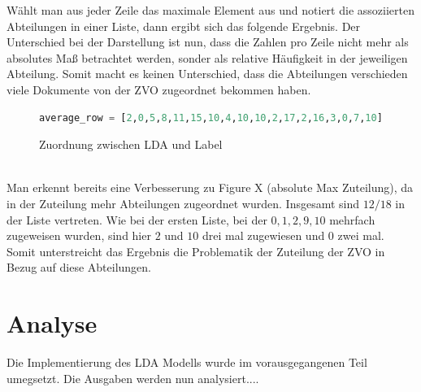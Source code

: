 \documentclass[german,version-2020-11]{uzl-thesis}
\begin{document}
\begin{enumerate}
Wählt man aus jeder Zeile das maximale Element aus und notiert die assoziierten Abteilungen in einer Liste, dann ergibt sich das folgende Ergebnis. Der Unterschied bei der Darstellung ist nun, dass die Zahlen pro Zeile nicht mehr als absolutes Maß betrachtet werden, sonder als relative Häufigkeit in der jeweiligen Abteilung. Somit macht es keinen Unterschied, dass die Abteilungen verschieden viele Dokumente von der ZVO zugeordnet bekommen haben. \\

\begin{figure}[h]
\begin{center}
\begin{lstlisting}[language=Python]
average_row = [2,0,5,8,11,15,10,4,10,10,2,17,2,16,3,0,7,10]
\end{lstlisting}
\caption{Zuordnung zwischen LDA und Label} 
\end{center}
\end{figure}\\

Man erkennt bereits eine Verbesserung zu Figure X (absolute Max Zuteilung), da in der Zuteilung mehr Abteilungen zugeordnet wurden. Insgesamt sind $12/18$ in der Liste vertreten. Wie bei der ersten Liste, bei der  $ 0,1,2,9,10 $ mehrfach zugeweisen wurden, sind hier $2$ und $10$ drei mal zugewiesen und $0$ zwei mal. Somit unterstreicht das Ergebnis die Problematik der Zuteilung der ZVO in Bezug auf diese Abteilungen. \\

\end{enumerate}

	
\chapter{Analyse}%
Die Implementierung des LDA Modells wurde im vorausgegangenen Teil umegsetzt. Die Ausgaben werden nun analysiert....
\end{document}
